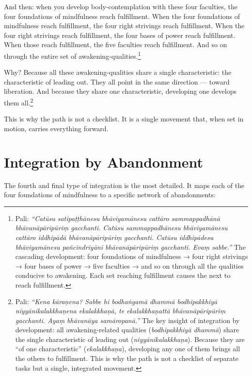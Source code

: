 And then: when you develop body-contemplation with these four faculties, the four foundations of mindfulness reach fulfillment. When the four foundations of mindfulness reach fulfillment, the four right strivings reach fulfillment. When the four right strivings reach fulfillment, the four bases of power reach fulfillment. When those reach fulfillment, the five faculties reach fulfillment. And so on through the entire set of awakening-qualities.\footnote{Pali: \textit{``Catūsu satipaṭṭhānesu bhāviyamānesu cattāro sammappadhānā bhāvanāpāripūriṃ gacchanti. Catūsu sammappadhānesu bhāviyamānesu cattāro iddhipādā bhāvanāpāripūriṃ gacchanti. Catūsu iddhipādesu bhāviyamānesu pañcindriyāni bhāvanāpāripūriṃ gacchanti. Evaṃ sabbe.''} The cascading development: four foundations of mindfulness → four right strivings → four bases of power → five faculties → and so on through all the qualities conducive to awakening. Each set reaching fulfillment causes the next to reach fulfillment.}

Why? Because all these awakening-qualities share a single characteristic: the characteristic of leading out. They all point in the same direction --- toward liberation. And because they share one characteristic, developing one develops them all.\footnote{Pali: \textit{``Kena kāraṇena? Sabbe hi bodhaṅgamā dhammā bodhipakkhiyā niyyānikalakkhaṇena ekalakkhaṇā, te ekalakkhaṇattā bhāvanāpāripūriṃ gacchanti. Ayaṃ bhāvanāya samāropanā.''} The key insight of integration by development: all awakening-related qualities (\textit{bodhipakkhiyā dhammā}) share the single characteristic of leading out (\textit{niyyānikalakkhaṇa}). Because they are ``of one characteristic'' (\textit{ekalakkhaṇa}), developing any one of them brings all the others to fulfillment. This is why the path is not a checklist of separate tasks but a single, integrated movement.}

This is why the path is not a checklist. It is a single movement that, when set in motion, carries everything forward.

\section*{Integration by Abandonment}

The fourth and final type of integration is the most detailed. It maps each of the four foundations of mindfulness to a specific network of abandonments:

